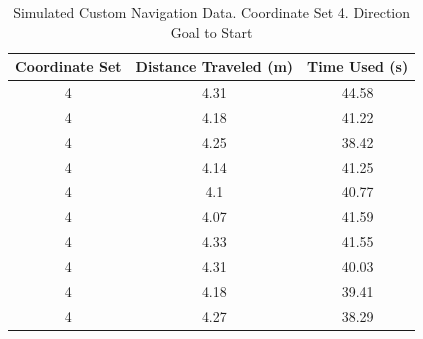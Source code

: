 \documentclass[%
paper=A4,               %
twoside=true,           %
openright,              %
11pt,                   %
bibliography=totoc,     %
titlepage=on,           %
DIV=12,                 %
BCOR=1.5cm,             %
parskip=half,            %
final
]{scrreprt}
\begin{document}
	
\begin{table}[h!]
	\centering
	\begin{tabular}{|c|c|c|}
		\hline
		Coordinate Set & Distance Traveled (m) & Time Used (s) \\
		\hline
		4 & 4.31 & 44.58 \\
		4 & 4.18 & 41.22 \\
		4 & 4.25 & 38.42 \\
		4 & 4.14 & 41.25 \\
		4 & 4.1 & 40.77 \\
		4 & 4.07 & 41.59 \\
		4 & 4.33 & 41.55 \\
		4 & 4.31 & 40.03 \\
		4 & 4.18 & 39.41 \\
		4 & 4.27 & 38.29 \\
		\hline
	\end{tabular}
	\caption{Simulated Custom Navigation Data. Coordinate Set 4. Direction Goal to Start}
	\label{tab:goal_to_start_set4}
\end{table}


		
	
	

	
\end{document}
